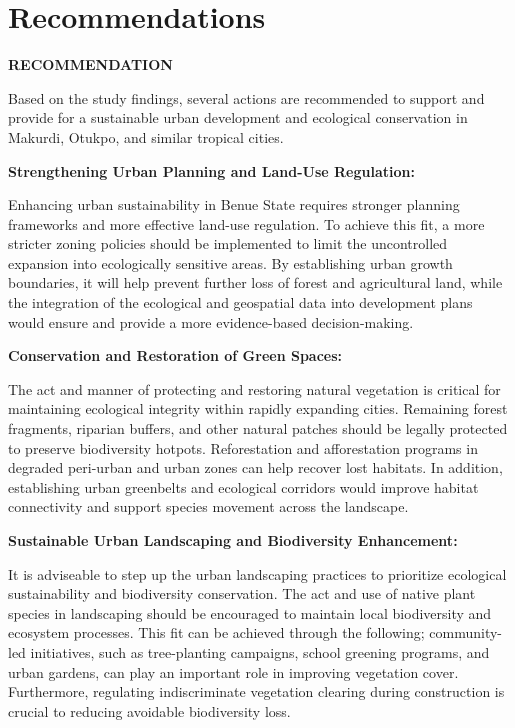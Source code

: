 \chapter*{Recommendations}
\label{ch:recommendations}

{}\textbf{RECOMMENDATION}

Based on the study findings, several actions are recommended to support and provide for a sustainable urban development and ecological conservation in Makurdi, Otukpo, and similar tropical cities.

\textbf{Strengthening Urban Planning and Land-Use Regulation:}

Enhancing urban sustainability in Benue State requires stronger planning frameworks and more effective land-use regulation. To achieve this fit, a more stricter zoning policies should be implemented to limit the uncontrolled expansion into ecologically sensitive areas. By establishing urban growth boundaries, it will help prevent further loss of forest and agricultural land, while the integration of the ecological and geospatial data into development plans would ensure and provide a more evidence-based decision-making.

\textbf{Conservation and Restoration of Green Spaces:}

The act and manner of protecting and restoring natural vegetation is critical for maintaining ecological integrity within rapidly expanding cities. Remaining forest fragments, riparian buffers, and other natural patches should be legally protected to preserve biodiversity hotpots. Reforestation and afforestation programs in degraded peri-urban and urban zones can help recover lost habitats. In addition, establishing urban greenbelts and ecological corridors would improve habitat connectivity and support species movement across the landscape.

\textbf{Sustainable Urban Landscaping and Biodiversity Enhancement:}

It is adviseable to step up the urban landscaping practices to prioritize ecological sustainability and biodiversity conservation. The act and use of native plant species in landscaping should be encouraged to maintain local biodiversity and ecosystem processes. This fit can be achieved through the following; community-led initiatives, such as tree-planting campaigns, school greening programs, and urban gardens, can play an important role in improving vegetation cover. Furthermore, regulating indiscriminate vegetation clearing during construction is crucial to reducing avoidable biodiversity loss.

